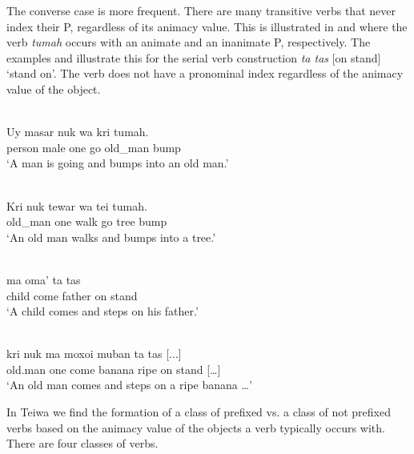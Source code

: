  

  

  

The converse case is more frequent. There are many transitive verbs that never index their P, regardless of its animacy value. This is illustrated in  and  where the verb \textit{tumah} occurs with an animate and an inanimate P, respectively. The examples  and  illustrate this for the serial verb construction \textit{ta tas} [on stand] `stand on'. The verb does not have a pronominal index regardless of the animacy value of the object.


\ea%
\label{bkm:Ref306281423}
 \\ 
\gll  Uy    masar  nuk  wa    kri  tumah. \\  
   person  male  one  go  old\_man  bump  \\
\glt  `A man is going and bumps into an old man.'
\z
 

\ea 
\label{ex:1243}
 \\ 
 \gll   Kri  nuk  tewar  wa  tei  tumah.\\
old\_man  one  walk  go  tree  bump   \\
 \glt `An old man walks and bumps into a tree.'
\z

 
 
\ea%
\label{bkm:Ref383697393}
 \\ 
  ma  oma'  ta  tas\\  
    child  come  father  on  stand \\
\glt `A child comes and steps on his father.'
\z

 
 

\ea%
\label{bkm:Ref383697402}
 \\ 
\gll   kri   nuk  ma  moxoi  muban  ta  tas  [...]\\  
   old.man  one  come  banana  ripe  on  stand  [{\dots}]  \\
\glt `An old man comes and steps on a ripe banana {\dots}'
\z

 
 

      

In Teiwa  we find the formation of a class of prefixed vs. a class of not prefixed verbs  based on the animacy  value of the objects  a verb typically occurs with. There are four classes of verbs.

